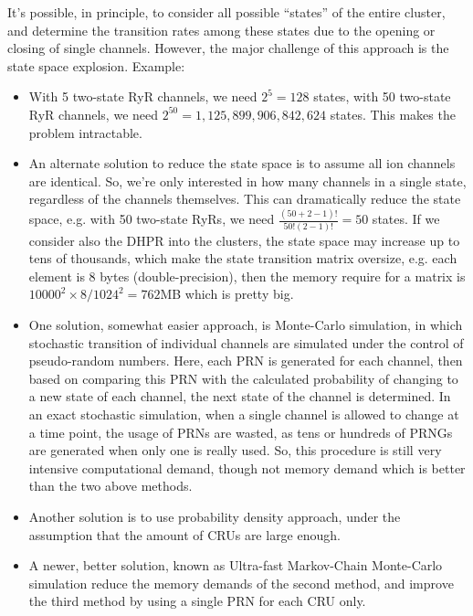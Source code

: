 It's possible, in principle, to consider all possible ``states'' of
the entire cluster, and determine the transition rates among these
states due to the opening or closing of single channels. However, the
major challenge of this approach is the state space
explosion. Example:
\begin{itemize}
\item With 5 two-state RyR channels, we need $2^5=128$ states, with 50
  two-state RyR channels, we need $2^{50}=1,125,899,906,842,624$
  states. This makes the problem intractable. 


\item An alternate solution to reduce the state space is to assume all
  ion channels are identical. So, we're only interested in how many
  channels in a single state, regardless of the channels
  themselves. This can dramatically reduce the state space, e.g. with
  50 two-state RyRs, we need $\frac{(50+2-1)!}{50!(2-1)!}=50$
  states. If we consider also the DHPR into the clusters, the state
  space may increase up to tens of thousands, which make the state
  transition matrix oversize, e.g. each element is 8 bytes
  (double-precision), then the memory require for a matrix is
  $10000^2\times 8/1024^2 = 762$MB which is pretty big. 


\item One solution, somewhat easier approach, is Monte-Carlo
  simulation, in which stochastic transition of individual channels
  are simulated under the control of pseudo-random numbers. Here, each
  PRN is generated for each channel, then based on comparing this PRN
  with the calculated probability of changing to a new state of each
  channel, the next state of the channel is determined. In an exact
  stochastic simulation, when a single channel is allowed to change at
  a time point, the usage of PRNs are wasted, as tens or hundreds of
  PRNGs are generated when only one is really used. So, this procedure
  is still very intensive computational demand, though not memory
  demand which is better than the two above methods.


\item Another solution is to use probability density approach, under
  the assumption that the amount of CRUs are large enough. 


\item A newer, better solution, known as Ultra-fast Markov-Chain
  Monte-Carlo simulation reduce the memory demands of the second
  method, and improve the third method by using a single PRN for each
  CRU only. 
\end{itemize}

